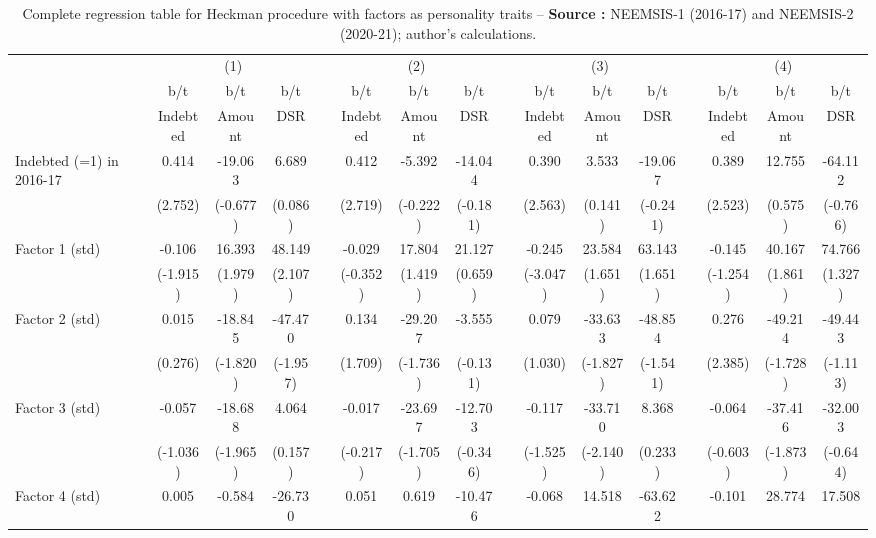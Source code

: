 {\tiny\tabcolsep=0pt
    \begin{longtable}{@{\extracolsep{\fill}}lccccccccccccccc}
	\caption{Complete regression table for Heckman procedure with factors as personality traits --  \textbf{Source :} NEEMSIS-1 (2016-17) and NEEMSIS-2 (2020-21); author's calculations.} \\
    \toprule
      & \multicolumn{3}{c}{(1)} &   & \multicolumn{3}{c}{(2)} &   & \multicolumn{3}{c}{(3)} &   & \multicolumn{3}{c}{(4)} \\
\cmidrule{2-4}\cmidrule{6-8}\cmidrule{10-12}\cmidrule{14-16}      & b/t & b/t & b/t &   & b/t & b/t & b/t &   & b/t & b/t & b/t &   & b/t & b/t & b/t \\
      & Indebted & Amount & DSR &   & Indebted & Amount & DSR &   & Indebted & Amount & DSR &   & Indebted & Amount & DSR \\
    \midrule
    Indebted (=1) in 2016-17 & 0.414 & -19.063 & 6.689 &       & 0.412 & -5.392 & -14.044 &       & 0.390 & 3.533 & -19.067 &       & 0.389 & 12.755 & -64.112 \\
          & (2.752) & (-0.677) & (0.086) &       & (2.719) & (-0.222) & (-0.181) &       & (2.563) & (0.141) & (-0.241) &       & (2.523) & (0.575) & (-0.766) \\
    Factor 1 (std) & -0.106 & 16.393 & 48.149 &       & -0.029 & 17.804 & 21.127 &       & -0.245 & 23.584 & 63.143 &       & -0.145 & 40.167 & 74.766 \\
          & (-1.915) & (1.979) & (2.107) &       & (-0.352) & (1.419) & (0.659) &       & (-3.047) & (1.651) & (1.651) &       & (-1.254) & (1.861) & (1.327) \\
    Factor 2 (std) & 0.015 & -18.845 & -47.470 &       & 0.134 & -29.207 & -3.555 &       & 0.079 & -33.633 & -48.854 &       & 0.276 & -49.214 & -49.443 \\
          & (0.276) & (-1.820) & (-1.957) &       & (1.709) & (-1.736) & (-0.131) &       & (1.030) & (-1.827) & (-1.541) &       & (2.385) & (-1.728) & (-1.113) \\
    Factor 3 (std) & -0.057 & -18.688 & 4.064 &       & -0.017 & -23.697 & -12.703 &       & -0.117 & -33.710 & 8.368 &       & -0.064 & -37.416 & -32.003 \\
          & (-1.036) & (-1.965) & (0.157) &       & (-0.217) & (-1.705) & (-0.346) &       & (-1.525) & (-2.140) & (0.233) &       & (-0.603) & (-1.873) & (-0.644) \\
    Factor 4 (std) & 0.005 & -0.584 & -26.730 &       & 0.051 & 0.619 & -10.476 &       & -0.068 & 14.518 & -63.622 &       & -0.101 & 28.774 & 17.508 \\

\end{longtable}}
